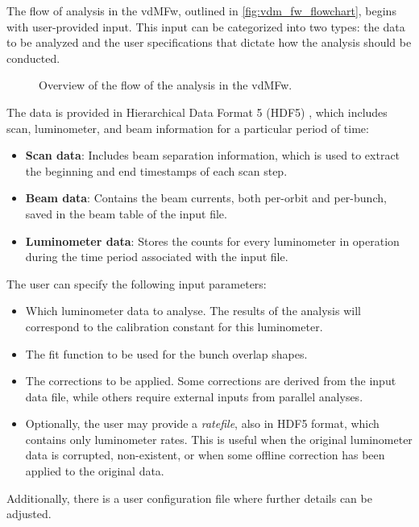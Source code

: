 The flow of analysis in the vdMFw, outlined in \autoref{fig:vdm_fw_flowchart}, begins with user-provided input. This input can be categorized into two types: the data to be analyzed and the user specifications that dictate how the analysis should be conducted.

\begin{figure}[!htb]
	\centering
	\caption{Overview of the flow of the analysis in the vdMFw.}
	\label{fig:vdm_fw_flowchart}
\end{figure}

The data is provided in Hierarchical Data Format 5 (HDF5) \cite{koranne2011hierarchical}, which includes scan, luminometer, and beam information for a particular period of time:
\begin{itemize}
	\item \textbf{Scan data}: Includes beam separation information, which is used to extract the beginning and end timestamps of each scan step.
	\item \textbf{Beam data}: Contains the beam currents, both per-orbit and per-bunch, saved in the beam table of the input file.
	\item \textbf{Luminometer data}: Stores the counts for every luminometer in operation during the time period associated with the input file.
\end{itemize}
The user can specify the following input parameters:
\begin{itemize}
	\item Which luminometer data to analyse. The results of the analysis will correspond to the calibration constant for this luminometer.
	\item The fit function to be used for the bunch overlap shapes.
	\item The corrections to be applied. Some corrections are derived from the input data file, while others require external inputs from parallel analyses.
	\item Optionally, the user may provide a \textit{ratefile}, also in HDF5 format, which contains only luminometer rates. This is useful when the original luminometer data is corrupted, non-existent, or when some offline correction has been applied to the original data.
\end{itemize}
Additionally, there is a user configuration file where further details can be adjusted.

